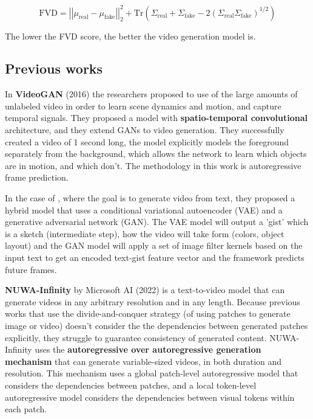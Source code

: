 \begin{equation*}
    \text{FVD} = \left| \left| \mu_{\text{real}} - \mu_{\text{fake}} \right| \right|^2_2 + \text{Tr} \left( \Sigma_{\text{real}} + \Sigma_{\text{fake}} - 2 \left( \Sigma_{\text{real}} \Sigma_{\text{fake}} \right)^{1/2} \right)
\end{equation*}

The lower the FVD score, the better the video generation model is.






\subsection{Previous works}

In \textbf{VideoGAN} \cite{video_gan} (2016) the researchers proposed to use of the large amounts of unlabeled video in order to learn scene dynamics and motion, and capture temporal signals. They proposed a model with \textbf{spatio-temporal convolutional} architecture, and they extend GANs to video generation. They successfully created a video of 1 second long, the model explicitly models the foreground separately from the background, which allows the network to learn which objects are in motion, and which don't. The methodology in this work is autoregressive frame prediction.

In the case of \cite{video_generation_from_text}, where the goal is to generate video from text, they proposed a hybrid model that uses a conditional variational autoencoder (VAE) and a generative adversarial network (GAN). The VAE model will output a 'gist' which is a sketch (intermediate step), how the video will take form (colors, object layout) and the GAN model will apply a set of image filter kernels based on the input text to get an encoded text-gist feature vector and the framework predicts future frames.

\textbf{NUWA-Infinity} \cite{nuwa_infinity} by Microsoft AI (2022) is a text-to-video model that can generate videos in any arbitrary resolution and in any length. Because previous works that use the divide-and-conquer strategy (of using patches to generate image or video) doesn't consider the the dependencies between generated patches explicitly, they struggle to guarantee consistency of generated content. NUWA-Infinity uses the \textbf{autoregressive over autoregressive generation mechanism} that can generate variable-sized videos, in both duration and resolution. This mechanism uses a global patch-level autoregressive
model that considers the dependencies between patches, and a local token-level autoregressive model considers the dependencies between visual tokens within each patch.

